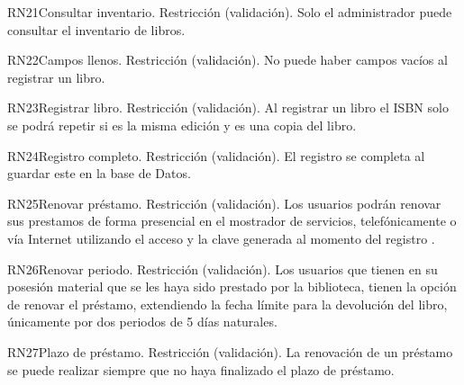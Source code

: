 \begin{BussinesRule}{RN21}{Consultar inventario.} 
	\BRitem[Tipo:] Restricción (validación).
	\BRitem[Descripción:]Solo el administrador puede consultar el inventario de libros.
\end{BussinesRule}

\begin{BussinesRule}{RN22}{Campos llenos.} 
	\BRitem[Tipo:] Restricción (validación).
	\BRitem[Descripción:]No puede haber campos vacíos al registrar un libro.
\end{BussinesRule}

\begin{BussinesRule}{RN23}{Registrar libro.} 
	\BRitem[Tipo:] Restricción (validación).
	\BRitem[Descripción:]Al registrar un libro el ISBN solo se podrá repetir si es la misma edición y es una copia del libro.
\end{BussinesRule}

\begin{BussinesRule}{RN24}{Registro completo.} 
	\BRitem[Tipo:] Restricción (validación).
	\BRitem[Descripción:]El registro se completa al guardar este en la base de Datos.
\end{BussinesRule}

\begin{BussinesRule}{RN25}{Renovar préstamo.} 
	\BRitem[Tipo:] Restricción (validación).
	\BRitem[Descripción:]Los usuarios podrán renovar sus prestamos de forma presencial en el mostrador de servicios, telefónicamente o vía Internet utilizando el acceso y la clave generada al momento del registro .
\end{BussinesRule}

\begin{BussinesRule}{RN26}{Renovar periodo.} 
	\BRitem[Tipo:] Restricción (validación).
	\BRitem[Descripción:]Los usuarios que tienen en su posesión material que se les haya sido prestado por la biblioteca, tienen la opción de renovar el préstamo, extendiendo la fecha límite para la devolución del libro, únicamente por dos periodos de 5 días naturales.
\end{BussinesRule}

\begin{BussinesRule}{RN27}{Plazo de préstamo.} 
	\BRitem[Tipo:] Restricción (validación).
	\BRitem[Descripción:]La renovación de un préstamo se puede realizar siempre que no haya finalizado el plazo de préstamo.
\end{BussinesRule}


